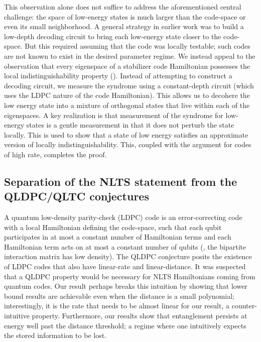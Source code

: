 \documentclass{toc}
\begin{document}
This observation alone does not suffice to address the aforementioned central challenge: the space of low-energy states is much larger than the code-space or even its small neighborhood. A general strategy in earlier %
work   %
\cite{8104078,Eldar2019RobustQE} was to build a low-depth decoding circuit
%
to bring each low-energy state closer to the code-space. But this required assuming that the code was locally testable; such codes are not known to exist in the desired parameter regime. We instead appeal to the observation that every eigenspace of a stabilizer code Hamiltonian possesses the local indistinguishability property (). Instead of attempting to construct a decoding circuit, we measure the syndrome using a constant-depth circuit (which uses the LDPC nature of the code Hamiltonian). This allows us to decohere the low energy state into a mixture of orthogonal states that live within each of the eigenspaces. A key realization is that measurement of the syndrome for low-energy states is a gentle measurement in that it does not perturb the state locally. This is used to show that a state of low energy satisfies an approximate version of locally indistinguishability. This, coupled with the argument for codes of high rate, completes the proof.


\subsection{Separation of the NLTS statement from the QLDPC/QLTC conjectures}
A quantum low-density parity-check (LDPC) code is an error-correcting code with a local Hamiltonian defining the code-space, such that each qubit participates in at most a constant number of Hamiltonian terms and each Hamiltonian term acts on at most a constant number of qubits (\ie, the bipartite interaction matrix has
%
low density).  %
The QLDPC conjecture posits the existence of LDPC codes that also have linear-rate and linear-distance. It was suspected that a QLDPC property would be necessary for NLTS Hamiltonians \cite{10.5555/2600498.2600507,doi:10.1137/140975498,hastings17,8104078,nirkhe_et_al:LIPIcs:2018:9095} coming from quantum codes. Our result perhaps breaks this intuition by showing that lower bound results are achievable even when the distance is a small polynomial; interestingly, it is the rate that needs to be almost linear for our result, a counter-intuitive property. Furthermore, our results show that entanglement persists at energy well past the distance threshold; 
a regime where one intuitively expects the stored information to be lost.
\end{document}
